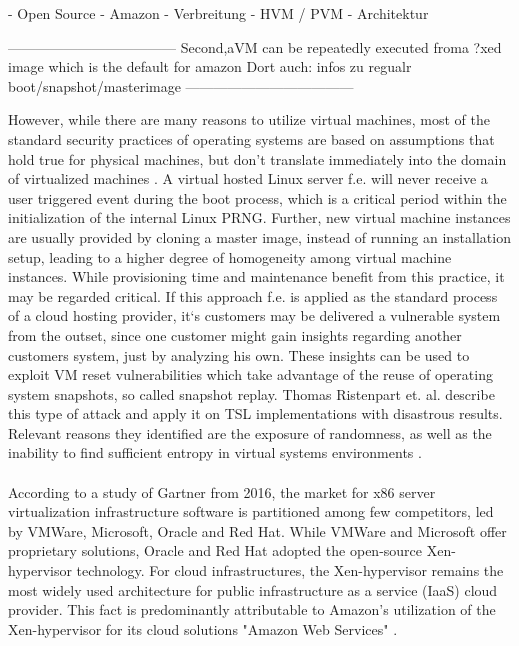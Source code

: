 - Open Source
- Amazon
- Verbreitung 
- HVM / PVM
- Architektur

------------------------------------
\cite{everspaugh2014not}
Second,aVM  can be repeatedly executed froma ?xed image which is the default for amazon
Dort auch: infos zu regualr boot/snapshot/masterimage
------------------------------------



However, while there are many reasons to utilize virtual machines, most of the standard security practices of operating systems are based on assumptions that hold true for physical machines, but don't translate immediately into the domain of virtualized machines \cite{kerrigan2012study}. A virtual hosted Linux server f.e. will never receive a user triggered event during the boot process, which is a critical period within the initialization of the internal Linux PRNG. Further, new virtual machine instances are usually provided by cloning a master image, instead of running an installation setup, leading to a higher degree of homogeneity among virtual machine instances. While provisioning time and maintenance benefit from this practice, it may be regarded critical. If this approach f.e. is applied as the standard process of a cloud hosting provider, it`s customers may be delivered a vulnerable system from the outset, since one customer might gain insights regarding another customers system, just by analyzing his own. These insights can be used to exploit VM reset vulnerabilities which take advantage of the reuse of  operating system snapshots, so called snapshot replay. Thomas Ristenpart et. al. describe this type of attack and apply it on TSL implementations with disastrous results. Relevant reasons they identified are the exposure of randomness, as well as the inability to find sufficient entropy in virtual systems environments \cite{ristenpart2010good, ristenpart2009hey}. \\~\\
According to a study of Gartner from 2016, the market for x86 server virtualization infrastructure software is partitioned among few competitors, led by VMWare, Microsoft, Oracle and Red Hat. While VMWare and Microsoft offer proprietary solutions, Oracle and Red Hat adopted the open-source Xen-hypervisor technology. For cloud infrastructures, the Xen-hypervisor remains the most widely used architecture for public infrastructure as a service (IaaS) cloud provider. This fact is predominantly attributable to Amazon's utilization of the Xen-hypervisor for its cloud solutions "Amazon Web Services" \cite{bittman2016magic}. 

